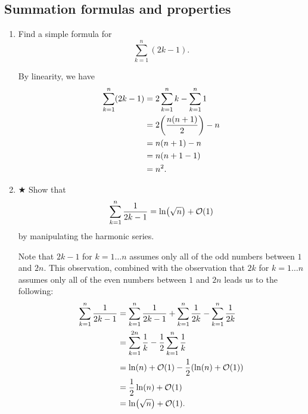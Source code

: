\documentclass[AppendixA]{subfiles}
\begin{document}
	\subsection{Summation formulas and properties}

	\begin{enumerate}[leftmargin=\labelsep]
		\item Find a simple formula for
		\[
			\sum_{k = 1}^n (2k - 1).
		\]
		\begin{answer}
			By linearity, we have
			\begin{align*}
				\sum_{k = 1}^n (2k - 1) &= 2 \sum_{k = 1}^n k - \sum_{k = 1}^n 1\\
					&= 2 \qty(\frac{n(n+1)}{2}) - n\\
					&= n(n+1) - n\\
					&= n(n+1 - 1)\\
					&= n^2.
			\end{align*}
		\end{answer}

		\item $\bigstar$ Show that
		\[
			\sum_{k = 1}^n \frac{1}{2k - 1} = \ln(\sqrt{n}) + \mathcal{O}(1)
		\]
		by manipulating the harmonic series.
		\begin{answer}
			Note that $2k - 1$ for $k = 1 \dots n$ assumes only all of the odd numbers between $1$ and $2n$. This observation, combined with the observation that $2k$ for $k = 1 \dots n$ assumes only all of the even numbers between $1$ and $2n$ leads us to the following:
			\begin{align*}
				\sum_{k = 1}^n \frac{1}{2k - 1} &= \sum_{k = 1}^n \frac{1}{2k - 1} + \sum_{k = 1}^n \frac{1}{2k} - \sum_{k = 1}^n \frac{1}{2k}\\
					&= \sum_{k = 1}^{2n} \frac{1}{k} - \frac{1}{2}\sum_{k = 1}^n \frac{1}{k}\\
					&= \ln(n) + \mathcal{O}(1) - \frac{1}{2}\qty(\ln(n) + \mathcal{O}(1))\\
					&= \frac{1}{2} \ln(n) + \mathcal{O}(1)\\
					&= \ln(\sqrt{n}) + \mathcal{O}(1).
			\end{align*}
		\end{answer}
		

\end{enumerate}
\end{document}
